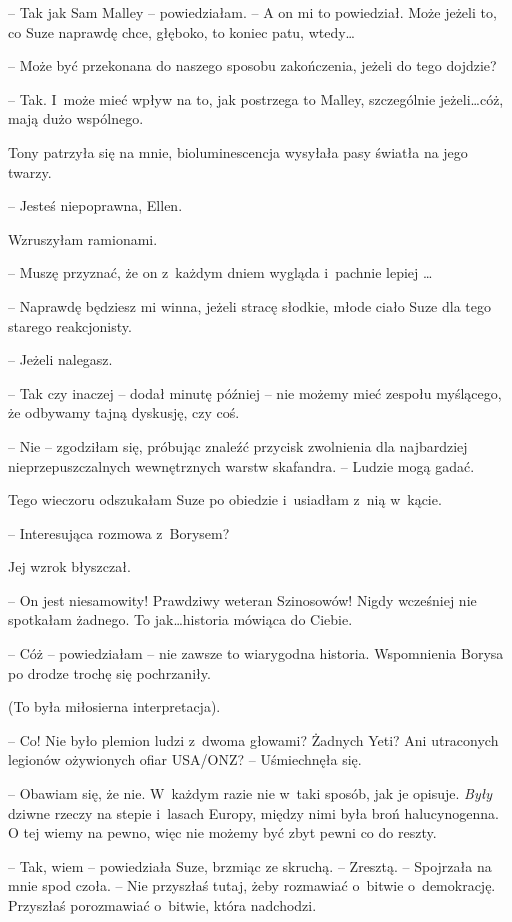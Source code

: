 \documentclass[oneside,polish,11pt,sfheadings]{mwbk}
\begin{document}
-- Tak jak Sam Malley -- powiedziałam. -- A on mi to powiedział. Może
jeżeli to, co Suze naprawdę chce, głęboko, to koniec patu, wtedy\ldots 

-- Może być przekonana do naszego sposobu zakończenia, jeżeli do tego
dojdzie?

-- Tak. I~może mieć wpływ na to, jak postrzega to Malley, szczególnie
jeżeli\ldots  cóż, mają dużo wspólnego.

Tony patrzyła się na mnie, bioluminescencja wysyłała pasy światła na
jego twarzy. 

-- Jesteś niepoprawna, Ellen.

Wzruszyłam ramionami. 

-- Muszę przyznać, że on z~każdym dniem wygląda i~pachnie lepiej \ldots 

-- Naprawdę będziesz mi winna, jeżeli stracę słodkie, młode ciało Suze
dla tego starego reakcjonisty.

-- Jeżeli nalegasz.

-- Tak czy inaczej -- dodał minutę później -- nie możemy mieć zespołu
myślącego, że odbywamy tajną dyskusję, czy coś.

-- Nie -- zgodziłam się, próbując znaleźć przycisk zwolnienia dla
najbardziej nieprzepuszczalnych wewnętrznych warstw skafandra. -- Ludzie
mogą gadać.

Tego wieczoru odszukałam Suze po obiedzie i~usiadłam z~nią w~kącie.

-- Interesująca rozmowa z~Borysem?

Jej wzrok błyszczał. 

-- On jest niesamowity! Prawdziwy weteran
Szinosowów! Nigdy wcześniej nie spotkałam żadnego. To jak\ldots  historia
mówiąca do Ciebie.

-- Cóż -- powiedziałam -- nie zawsze to wiarygodna historia. Wspomnienia
Borysa po drodze trochę się pochrzaniły.

(To była miłosierna interpretacja).

-- Co! Nie było plemion ludzi z~dwoma głowami? Żadnych Yeti? Ani
utraconych legionów ożywionych ofiar USA/ONZ? -- Uśmiechnęła się.

-- Obawiam się, że nie. W~każdym razie nie w~taki sposób, jak je opisuje.
\textit{Były} dziwne rzeczy na stepie i~lasach Europy, między nimi była
broń halucynogenna. O tej wiemy na pewno, więc nie możemy być zbyt pewni
co do reszty.

-- Tak, wiem -- powiedziała Suze, brzmiąc ze skruchą. -- Zresztą. -- Spojrzała na mnie spod czoła. -- Nie przyszłaś tutaj, żeby rozmawiać o~bitwie o~demokrację. Przyszłaś porozmawiać o~bitwie, która nadchodzi.
\end{document}
